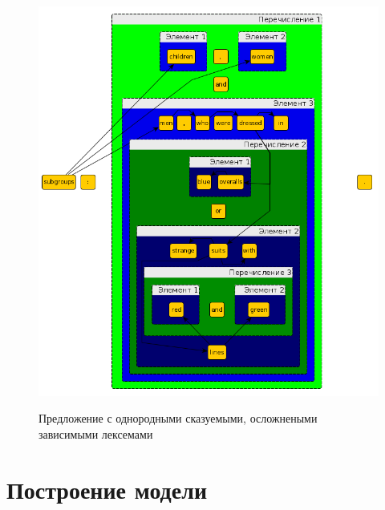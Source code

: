 \documentclass{standalone}
\begin{document}
\begin{figure}[!ht]
\includegraphics[width=\textwidth]{images/sentences5.png}
\label{sss}
\caption{Предложение с однородными сказуемыми, осложнеными зависимыми лексемами}
\end{figure}
\newpage
\section{Построение модели}
%
\par 
\end{document}
